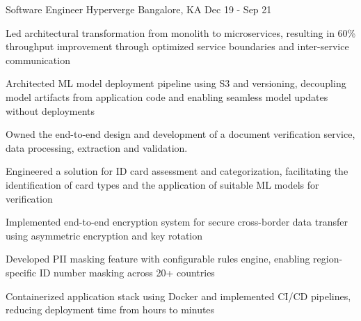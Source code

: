 \begin{cventries}
  \cventry
    {Software Engineer}
    {Hyperverge}
    {Bangalore, KA}
    {Dec 19  - Sep 21}
    {
      \begin{cvitems}
        \item {Led architectural transformation from monolith to microservices, resulting in 60\% throughput improvement through optimized service boundaries and inter-service communication}
        \item {Architected ML model deployment pipeline using S3 and versioning, decoupling model artifacts from application code and enabling seamless model updates without deployments}
        \item {Owned the end-to-end design and development of a document verification service, data processing, extraction and validation.}
        \item {Engineered a solution for ID card assessment and categorization, facilitating the identification of card types and the application of suitable ML models for verification}
        \item {Implemented end-to-end encryption system for secure cross-border data transfer using asymmetric encryption and key rotation}
        \item {Developed PII masking feature with configurable rules engine, enabling region-specific ID number masking across 20+ countries}
        \item {Containerized application stack using Docker and implemented CI/CD pipelines, reducing deployment time from hours to minutes}
      \end{cvitems}
    }

\end{cventries}
